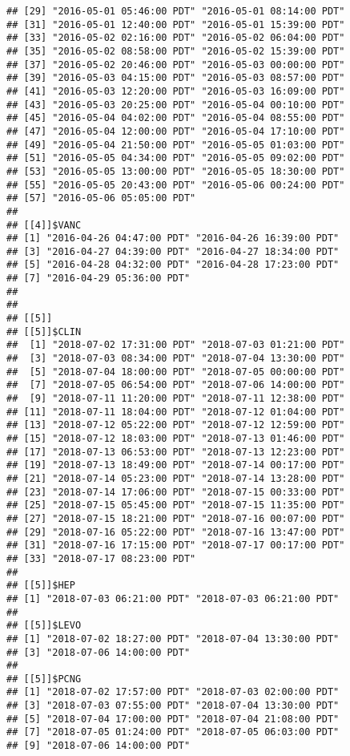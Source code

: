 \documentclass[]{article}
\begin{document}
\begin{verbatim}
## [29] "2016-05-01 05:46:00 PDT" "2016-05-01 08:14:00 PDT"
## [31] "2016-05-01 12:40:00 PDT" "2016-05-01 15:39:00 PDT"
## [33] "2016-05-02 02:16:00 PDT" "2016-05-02 06:04:00 PDT"
## [35] "2016-05-02 08:58:00 PDT" "2016-05-02 15:39:00 PDT"
## [37] "2016-05-02 20:46:00 PDT" "2016-05-03 00:00:00 PDT"
## [39] "2016-05-03 04:15:00 PDT" "2016-05-03 08:57:00 PDT"
## [41] "2016-05-03 12:20:00 PDT" "2016-05-03 16:09:00 PDT"
## [43] "2016-05-03 20:25:00 PDT" "2016-05-04 00:10:00 PDT"
## [45] "2016-05-04 04:02:00 PDT" "2016-05-04 08:55:00 PDT"
## [47] "2016-05-04 12:00:00 PDT" "2016-05-04 17:10:00 PDT"
## [49] "2016-05-04 21:50:00 PDT" "2016-05-05 01:03:00 PDT"
## [51] "2016-05-05 04:34:00 PDT" "2016-05-05 09:02:00 PDT"
## [53] "2016-05-05 13:00:00 PDT" "2016-05-05 18:30:00 PDT"
## [55] "2016-05-05 20:43:00 PDT" "2016-05-06 00:24:00 PDT"
## [57] "2016-05-06 05:05:00 PDT"
## 
## [[4]]$VANC
## [1] "2016-04-26 04:47:00 PDT" "2016-04-26 16:39:00 PDT"
## [3] "2016-04-27 04:39:00 PDT" "2016-04-27 18:34:00 PDT"
## [5] "2016-04-28 04:32:00 PDT" "2016-04-28 17:23:00 PDT"
## [7] "2016-04-29 05:36:00 PDT"
## 
## 
## [[5]]
## [[5]]$CLIN
##  [1] "2018-07-02 17:31:00 PDT" "2018-07-03 01:21:00 PDT"
##  [3] "2018-07-03 08:34:00 PDT" "2018-07-04 13:30:00 PDT"
##  [5] "2018-07-04 18:00:00 PDT" "2018-07-05 00:00:00 PDT"
##  [7] "2018-07-05 06:54:00 PDT" "2018-07-06 14:00:00 PDT"
##  [9] "2018-07-11 11:20:00 PDT" "2018-07-11 12:38:00 PDT"
## [11] "2018-07-11 18:04:00 PDT" "2018-07-12 01:04:00 PDT"
## [13] "2018-07-12 05:22:00 PDT" "2018-07-12 12:59:00 PDT"
## [15] "2018-07-12 18:03:00 PDT" "2018-07-13 01:46:00 PDT"
## [17] "2018-07-13 06:53:00 PDT" "2018-07-13 12:23:00 PDT"
## [19] "2018-07-13 18:49:00 PDT" "2018-07-14 00:17:00 PDT"
## [21] "2018-07-14 05:23:00 PDT" "2018-07-14 13:28:00 PDT"
## [23] "2018-07-14 17:06:00 PDT" "2018-07-15 00:33:00 PDT"
## [25] "2018-07-15 05:45:00 PDT" "2018-07-15 11:35:00 PDT"
## [27] "2018-07-15 18:21:00 PDT" "2018-07-16 00:07:00 PDT"
## [29] "2018-07-16 05:22:00 PDT" "2018-07-16 13:47:00 PDT"
## [31] "2018-07-16 17:15:00 PDT" "2018-07-17 00:17:00 PDT"
## [33] "2018-07-17 08:23:00 PDT"
## 
## [[5]]$HEP
## [1] "2018-07-03 06:21:00 PDT" "2018-07-03 06:21:00 PDT"
## 
## [[5]]$LEVO
## [1] "2018-07-02 18:27:00 PDT" "2018-07-04 13:30:00 PDT"
## [3] "2018-07-06 14:00:00 PDT"
## 
## [[5]]$PCNG
## [1] "2018-07-02 17:57:00 PDT" "2018-07-03 02:00:00 PDT"
## [3] "2018-07-03 07:55:00 PDT" "2018-07-04 13:30:00 PDT"
## [5] "2018-07-04 17:00:00 PDT" "2018-07-04 21:08:00 PDT"
## [7] "2018-07-05 01:24:00 PDT" "2018-07-05 06:03:00 PDT"
## [9] "2018-07-06 14:00:00 PDT"

\end{verbatim}
\end{document}
